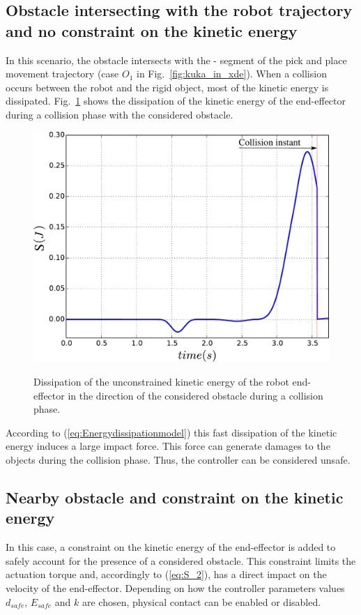 \documentclass[a4paper, 10pt, conference]{ieeeconf}      %
\newcommand*\circled[1]{\tikz[baseline=(char.base)]{
            \node[shape=circle,draw,inner sep=0.5pt] (char) {#1};}}
\begin{document}
\subsection{Obstacle intersecting with the robot trajectory and no constraint on the kinetic energy}

In this scenario, the obstacle intersects with the \circled{2}-\circled{3} segment of the pick and place movement trajectory (case $O_1$ in Fig.~\ref{fig:kuka_in_xde}). When a collision occurs between the robot and the rigid object, most of the kinetic energy is dissipated. Fig.~\ref{fig:Ke_wO_wC_woEc} shows the dissipation of the kinetic energy of the end-effector during a collision phase with the considered obstacle. 

\begin{figure}[h]
\centering
{\includegraphics[width=0.9\columnwidth]{figures/Ke_wO_wC_woEc}}
\caption{Dissipation of the unconstrained kinetic energy of the robot end-effector in the direction of the considered obstacle during a collision phase.} 
\label{fig:Ke_wO_wC_woEc}
\end{figure}

According to (\ref{eq:Energydissipationmodel}) this fast dissipation of the kinetic energy induces a large impact force. This force can generate damages to the objects during the collision phase. Thus, the controller can be considered unsafe.   

\subsection{Nearby obstacle and constraint on the kinetic energy}
In this case, a constraint on the kinetic energy of the end-effector is added to safely account for the presence of a considered obstacle. This constraint limits the actuation torque and, accordingly to (\ref{eq:S_2}), has a direct impact on the velocity of the end-effector. Depending on how the controller parameters values $d_{safe}$, $E_{safe}$ and $k$ are chosen, physical contact can be enabled or disabled.
\end{document}
